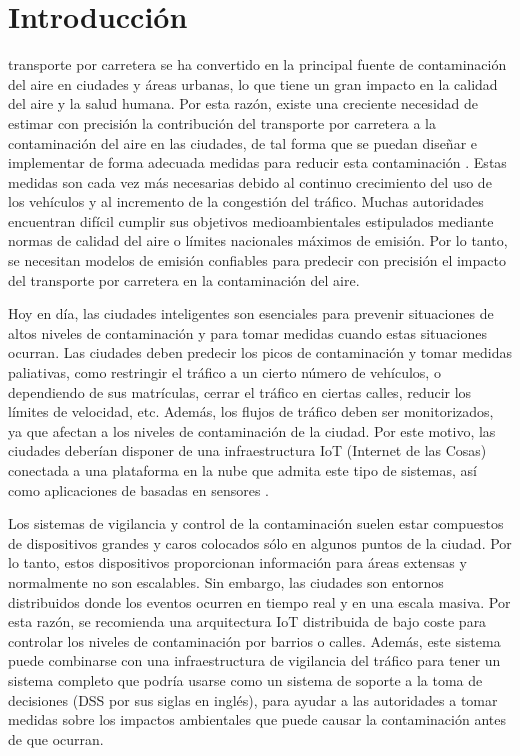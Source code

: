 \chapter{Introducción}
 transporte por carretera se ha convertido en la principal fuente de contaminación del aire en ciudades y áreas urbanas, lo que tiene un gran impacto en la calidad del aire y la salud humana. Por esta razón, existe una creciente necesidad de estimar con precisión la contribución del transporte por carretera a la contaminación del aire en las ciudades, de tal forma que se puedan diseñar e implementar de forma adecuada medidas para reducir esta contaminación \cite{SNB10}. Estas medidas son cada vez más necesarias debido al continuo crecimiento del uso de los vehículos y al incremento de la congestión del tráfico. Muchas autoridades encuentran difícil cumplir sus objetivos medioambientales estipulados mediante normas de calidad del aire o límites nacionales máximos de emisión. Por lo tanto, se necesitan modelos de emisión confiables para predecir con precisión el impacto del transporte por carretera en la contaminación del aire.

Hoy en día, las ciudades inteligentes son esenciales para prevenir situaciones de altos niveles de contaminación y para tomar medidas cuando estas situaciones ocurran. Las ciudades deben predecir los picos de contaminación y tomar medidas paliativas, como restringir el tráfico a un cierto número de vehículos, o dependiendo de sus matrículas, cerrar el tráfico en ciertas calles, reducir los límites de velocidad, etc. Además, los flujos de tráfico deben ser monitorizados, ya que afectan a los niveles de contaminación de la ciudad. Por este motivo, las ciudades deberían disponer de una infraestructura \ac{IoT} (Internet de las Cosas) conectada a una plataforma en la nube que admita este tipo de sistemas, así como aplicaciones de  basadas en sensores \cite{Bib18}.

Los sistemas de vigilancia y control de la contaminación suelen estar compuestos de dispositivos grandes y caros colocados sólo en algunos puntos de la ciudad. Por lo tanto, estos dispositivos proporcionan información para áreas extensas y normalmente no son escalables. Sin embargo, las ciudades son entornos distribuidos donde los eventos ocurren en tiempo real y en una escala masiva. Por esta razón, se recomienda una arquitectura \ac{IoT} distribuida de bajo coste para controlar los niveles de contaminación por barrios o calles. Además, este sistema puede combinarse con una infraestructura de vigilancia del tráfico para tener un sistema completo que podría usarse como un sistema de soporte a la toma de decisiones (\ac{DSS} por sus siglas en inglés), para ayudar a las autoridades a tomar medidas sobre los impactos ambientales que puede causar la contaminación antes de que ocurran.

